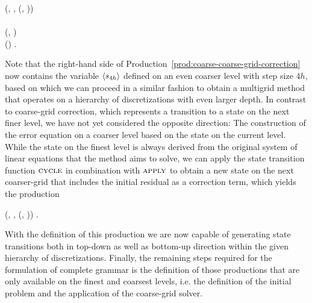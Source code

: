 \begin{bnf}
	 {
		(\bnfts{$\omega$}, \bnfsp {}, \bnfsp {}(, \bnfsp {})) \bnfor
	} \\
	 \\
	 {
		(, \bnfsp {})
	} \\
	 {
		() \bnfsp {} \bnfsp {}.
	}\label{prod:coarse-coarse-grid-correction}
\end{bnf}
Note that the right-hand side of Production~\eqref{prod:coarse-coarse-grid-correction} now contains the variable $\langle s_{4h} \rangle$ defined on an even coarser level with step size $4h$, based on which we can proceed in a similar fashion to obtain a multigrid method that operates on a hierarchy of discretizations with even larger depth.
In contrast to coarse-grid correction, which represents a transition to a state on the next finer level, we have not yet considered the opposite direction: The construction of the error equation on a coarser level based on the state on the current level.
While the state on the finest level is always derived from the original system of linear equations that the method aims to solve, we can apply the state transition function $\textsc{cycle}$ in combination with $\textsc{apply}$ to obtain a new state on the next coarser-grid that includes the initial residual as a correction term, which yields the production
\begin{bnf}
 {
	(, \bnfsp {}, \bnfsp {}(, \bnfsp {}))
}.
\end{bnf}
With the definition of this production we are now capable of generating state transitions both in top-down as well as bottom-up direction within the given hierarchy of discretizations.
Finally, the remaining steps required for the formulation of complete grammar is the definition of those productions that are only available on the finest and coarsest levels, i.e. the definition of the initial problem and the application of the coarse-grid solver.
